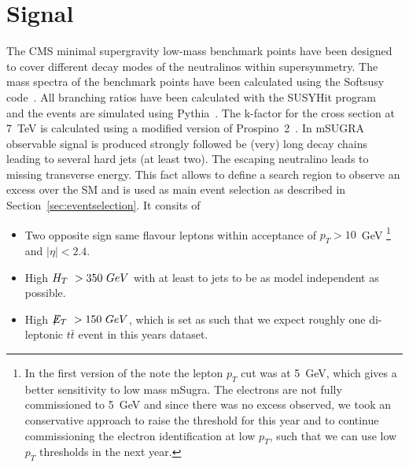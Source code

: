 \section{Signal}\label{sec:signal}

The CMS minimal supergravity low-mass benchmark points
have been designed to cover 
different decay modes of the neutralinos within supersymmetry. 
The mass spectra of the benchmark points have been calculated using the Softsusy code~\cite{softsusy}. 
All branching ratios have been calculated with the SUSYHit program~\cite{susyhit} 
and the events are simulated using Pythia~\cite{pythia}. 
The k-factor for the cross section at 7~TeV is calculated using a modified version of Prospino~2~\cite{prospino}. 
In mSUGRA observable signal is produced strongly followed be (very) long decay chains 
leading to several hard jets (at least two). 
The escaping neutralino leads to missing transverse energy. 
This fact allows to define a search region to observe an excess over the SM 
and is used as main event selection as described in Section~\ref{sec:eventselection}.
It consits of
\begin{itemize}
\item Two opposite sign same flavour leptons within acceptance of $p_T>10$~GeV
\footnote{In the first version of the note the lepton $p_T$ cut was at 5~GeV, which gives a better
sensitivity to low mass mSugra. The electrons are not fully commissioned to 5~GeV and since there
was no excess observed, we took an conservative approach to raise the threshold for this year and to continue
commissioning the electron identification at low $p_T$, such that we can use low $p_T$ thresholds in the next year.}
and  $|\eta|<2.4$.
\item High $H_T~>350~GeV$ with at least to jets to be as model independent as possible.
\item High $\displaystyle{\not} E_T~>150~GeV$, which is set as such that we expect roughly one di-leptonic $t\bar{t}$ event in this years dataset.
\end{itemize}


